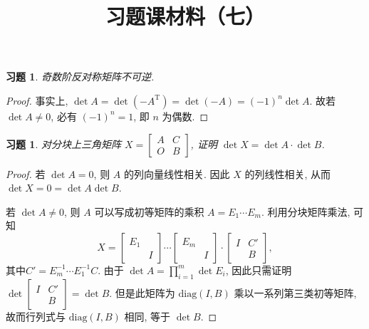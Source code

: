 \documentclass[UTF8]{ctexart}
\newtheorem{ex}[thm]{习题}
\begin{document}
\title{习题课材料（七）}
\date{}

\maketitle



\begin{ex}
  奇数阶反对称矩阵不可逆.
\end{ex}

\begin{proof}
  事实上, \(\det A = \det (-A^{\mathrm{T}}) = \det(-A) = (-1)^{n}\det A\).
  故若 \(\det A \neq 0\), 必有 \((-1)^{n} = 1\), 即 \(n\) 为偶数.
\end{proof}

\begin{ex}
  对分块上三角矩阵 \(X=\begin{bmatrix}A & C \\ O & B\end{bmatrix}\),
  证明 \(\det X = \det A \cdot \det B\).
\end{ex}

\begin{proof}
  若 \(\det A = 0\),
  则 \(A\) 的列向量线性相关. 因此 \(X\) 的列线性相关, 从而
  \(\det X = 0 = \det A\det B\).

  若 \(\det A \neq 0\),
  则 \(A\) 可以写成初等矩阵的乘积
  \(A = E_1\cdots E_{m}\).
  利用分块矩阵乘法, 可知
  \begin{equation*}
    X =
    \begin{bmatrix}
      E_1  \\ & I
    \end{bmatrix} \cdots
    \begin{bmatrix}
      E_m  \\ & I
    \end{bmatrix}
    \cdot
    \begin{bmatrix}
      I & C' \\ & B
    \end{bmatrix},
  \end{equation*}
  其中\(C' = E_{m}^{-1}\cdots E_{1}^{-1}C\).
  由于 \(\det A = \prod_{i=1}^{m} \det E_i\),
  因此只需证明 \(\det\begin{bmatrix}I& C'\\ & B\end{bmatrix}=\det B\).
  但是此矩阵为 \(\mathrm{diag}(I,B)\) 乘以一系列第三类初等矩阵, 故而行列式与
  \(\mathrm{diag}(I,B)\) 相同, 等于 \(\det B\).
\end{proof}
\end{document}
